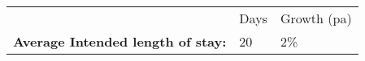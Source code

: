 \begin{tabular}[t]{p{5cm}p{1.3cm}p{1.2cm}}
   & Days & Growth (pa) \\ 
 \textbf{Average Intended length of stay:} & 20 & 2\% \\ 
  \end{tabular}

